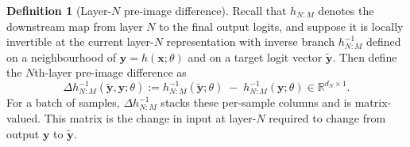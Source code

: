 \documentclass{article}
\theoremstyle{plain}
\theoremstyle{definition}
\newtheorem{definition}[theorem]{Definition}
\theoremstyle{remark}
\begin{document}
\begin{definition}[Layer-$N$ pre-image difference]
Recall that $h_{N:M}$ denotes the downstream map from layer $N$ to the final output logits, and suppose it is locally invertible at the current layer-$N$ representation with inverse branch $h_{N:M}^{-1}$ defined on a neighbourhood of $\mathbf y=h(\mathbf x;\theta)$ and on a target logit vector $\tilde{\mathbf y}$. Then define the $N$th-layer pre-image difference as
\[
\Delta h_{N:M}^{-1}(\tilde{\mathbf y},\mathbf y ;\theta)
:= h_{N:M}^{-1}(\tilde{\mathbf y};\theta)\;-\;h_{N:M}^{-1}(\mathbf y;\theta)
\in \mathbb{R}^{d_N\times 1}.
\]
For a batch of samples, $\Delta h_{N:M}^{-1}$ stacks these per-sample columns and is matrix-valued. This matrix is the change in input at layer-$N$ required to change from output $\mathbf y$ to $\tilde{\mathbf y}$.
\end{definition}



\end{document}
